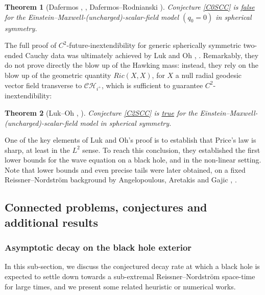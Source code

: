 \documentclass[10pt,a4paper]{article}
\theoremstyle{plain}
\newtheorem*{thmunb}{Theorem}
\theoremstyle{remark}
\theoremstyle{definition}
\theoremstyle{plain}
\theoremstyle{remark}
\theoremstyle{definition}
\newcommand{\CH}{\mathcal{CH}_{i^+}}
\numberwithin{equation}{section}
\begin{document}
\begin{thmunb}[Dafermos \cite{MihalisPHD}, \cite{Mihalis1}, Dafermos--Rodnianski \cite{PriceLaw}]
	Conjecture \ref{C0SCC} is \underline{false} for the Einstein--Maxwell-(uncharged)-scalar-field model $(q_0=0)$ in spherical symmetry.
\end{thmunb} The full proof of $C^2$-future-inextendibility for generic spherically symmetric two-ended Cauchy data was ultimately achieved by Luk and Oh \cite{JonathanStab}, \cite{JonathanStabExt}. Remarkably, they do not prove directly the blow up of the Hawking mass: instead, they rely on the blow up of the geometric quantity $Ric(X,X)$, for $X$ a null radial geodesic vector field transverse to $\CH$, which is sufficient to guarantee $C^2$-inextendibility:

\begin{thmunb}[Luk--Oh \cite{JonathanStab}, \cite{JonathanStabExt}]
	Conjecture \ref{C2SCC} is \underline{true} for the Einstein--Maxwell-(uncharged)-scalar-field model in spherical symmetry.
\end{thmunb}
One of the key elements of Luk and Oh's proof is to establish that Price's law is sharp, at least in the $L^2$ sense. To reach this conclusion, they established the first lower bounds for the wave equation on a black hole, and in the non-linear setting. Note that lower bounds and even precise tails were later obtained, on a fixed Reissner--Nordstr\"{o}m background by Angelopoulous, Aretakis and Gajic \cite{Newrp}, \cite{Latetime}.


\subsection{Connected problems, conjectures and additional results} \label{connected}
\subsubsection{Asymptotic decay on the black hole exterior} \label{decayconj}

In this sub-section, we discuss the conjectured decay rate at which a black hole is expected to settle down towards a sub-extremal Reissner--Nordstr\"{o}m space-time for large times, and we present some related heuristic or numerical works.
\end{document}
